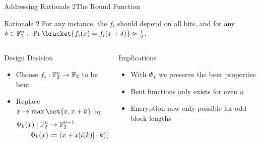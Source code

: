 \begin{frame}{Addressing Rationale 2}{The Round Function}
    \hspace*{-8.5pt}
    \begin{minipage}{1.0145\textwidth}
    \begin{exampleblock}{Rationale 2}
        For any instance, the $f_i$ should depend on all bits, and for any $\delta \in \F_2^n:\ \Pr\bracket{f_i(x) = f_i(x + \delta)} \approx \frac{1}{2}$.
    \end{exampleblock}
    \end{minipage}
    \begin{columns}
        \begin{column}{0.49\textwidth}
            \begin{block}{Design Decision}
                \begin{itemize}
                    \item Choose $f_i : \mathbb{F}_2^n \to \mathbb{F}_2$ to be bent
                    \item Replace $x \mapsto \max \set{x, x+k}$ by
                          \begin{align*}
                              \Phi_k(x) : \F_2^n &\to \F_2^{n-1} \\
                              \Phi_k(x) &\coloneqq (x + x[i(k)] \cdot k)[j]_{\tower{1 \leqslant j \leqslant n}{j \neq i(k)}}
                          \end{align*}
                \end{itemize}
            \end{block}
        \end{column}
        \begin{column}{0.49\textwidth}
            \begin{block}{Implications}
                \begin{itemize}
                    \item With $\Phi_k$ we preserve the bent properties\\[5pt]
                    \item Bent functions only exists for even $n$\\[5pt]
                    \item Encryption now only possible for odd block lengths
                \end{itemize}
                \vspace{16pt}
            \end{block}
        \end{column}
    \end{columns}
\end{frame}

